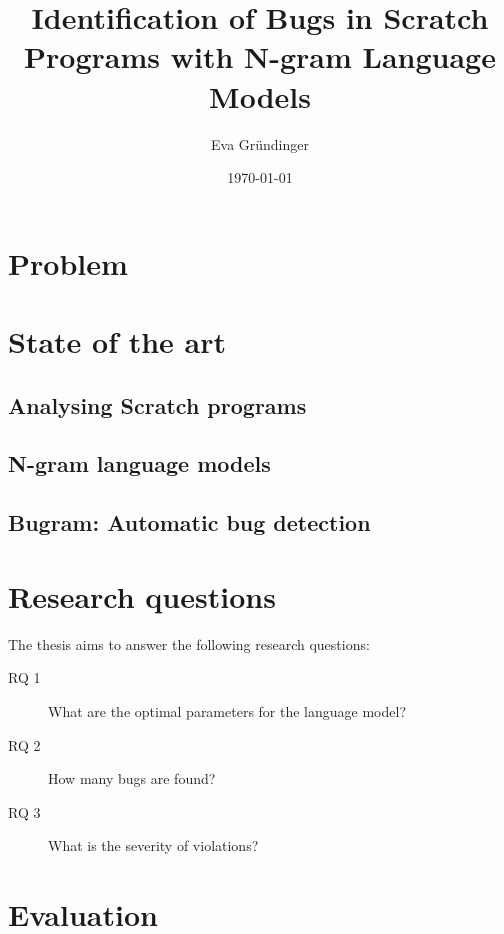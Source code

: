 \documentclass[
    numbers=noenddot,
    parskip=half-,
    fontsize=12pt,
    paper=a4,
    oneside,
    titlepage,
    bibliography=totoc,
    chapterprefix=false,
]{scrbook}
\title{Identification of Bugs in Scratch Programs with N-gram Language Models}
\author{Eva Gründinger}
\date{\today}
\begin{document}

    \frontmatter
    
    \tableofcontents
    \newpage


    \mainmatter

    \chapter{Problem}\label{ch:problem}
    

    \chapter{State of the art}\label{ch:state-of-the-art}
    
    \section{Analysing Scratch programs}\label{sec:analyzing-scratch}

    \section{N-gram language models}\label{sec:language-models}

    \section{Bugram: Automatic bug detection}\label{sec:bugram}


    \chapter{Research questions}\label{ch:research-questions}
    The thesis aims to answer the following research questions:

    \begin{description}
        \item[RQ 1] What are the optimal parameters for the language model?
        \item[RQ 2] How many bugs are found?
        \item[RQ 3] What is the severity of violations?
    \end{description}


    \chapter{Evaluation}\label{ch:evaluation}
    
\end{document}
